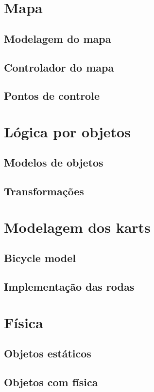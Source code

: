\section{Mapa}
\subsection{Modelagem do mapa}
\subsection{Controlador do mapa}
\subsection{Pontos de controle}

\section{Lógica por objetos}
\subsection{Modelos de objetos}
\subsection{Transformações}

\section{Modelagem dos karts}
\subsection{Bicycle model}
\subsection{Implementação das rodas}

\section{Física}
\subsection{Objetos estáticos}
\subsection{Objetos com física}

